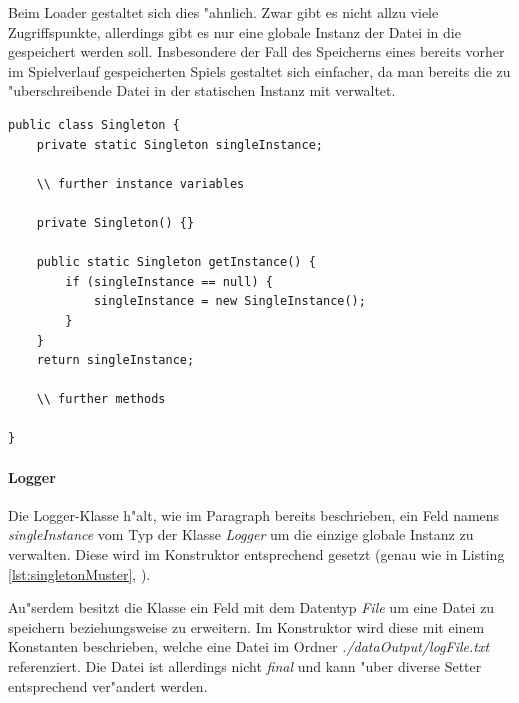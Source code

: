 Beim Loader gestaltet sich dies "ahnlich. Zwar gibt es nicht allzu viele Zugriffspunkte, allerdings gibt es nur eine globale Instanz der Datei in die gespeichert werden soll. Insbesondere der Fall des Speicherns eines bereits vorher im Spielverlauf gespeicherten Spiels gestaltet sich einfacher, da man bereits die zu "uberschreibende Datei in der statischen Instanz mit verwaltet. 

\begin{lstlisting}[float,style=CodeHighlighting,caption=Singleton-Muster,label=lst:singletonMuster]
public class Singleton {
	private static Singleton singleInstance; 
	
	\\ further instance variables
	
	private Singleton() {}
	
	public static Singleton getInstance() {
		if (singleInstance == null) {
			singleInstance = new SingleInstance(); 
		}
	}
	return singleInstance; 
	
	\\ further methods	
	
}
\end{lstlisting}


\paragraph{Logger}
\label{par:logger}
Die Logger-Klasse h"alt, wie im Paragraph  bereits beschrieben, ein Feld namens \emph{singleInstance} vom Typ der Klasse \emph{Logger} um die einzige globale Instanz zu verwalten. Diese wird im Konstruktor entsprechend gesetzt (genau wie in Listing \ref{lst:singletonMuster}, ). 

Au"serdem besitzt die Klasse ein Feld mit dem Datentyp \emph{File} um eine Datei zu speichern beziehungsweise zu erweitern. Im Konstruktor wird diese mit einem Konstanten beschrieben, welche eine Datei im Ordner \emph{./dataOutput/logFile.txt} referenziert. Die Datei ist allerdings nicht \emph{final} und kann "uber diverse Setter entsprechend ver"andert werden. 

